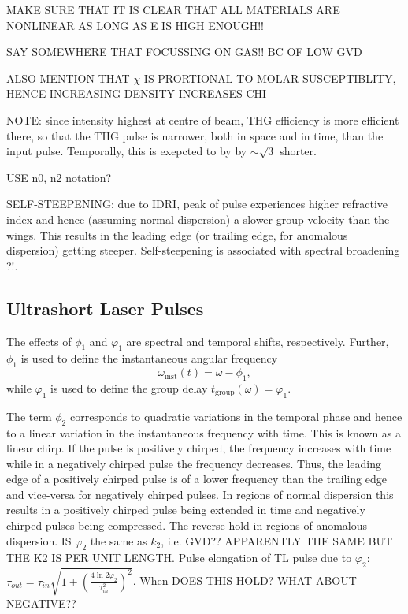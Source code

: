 \documentclass[a4paper]{jpconf}
\begin{document}
MAKE SURE THAT IT IS CLEAR THAT ALL MATERIALS ARE NONLINEAR AS LONG AS E IS HIGH ENOUGH!!

SAY SOMEWHERE THAT FOCUSSING ON GAS!! BC OF LOW GVD 


ALSO MENTION THAT $\chi$ IS PRORTIONAL TO MOLAR SUSCEPTIBLITY, HENCE INCREASING DENSITY INCREASES CHI


NOTE: since intensity highest at centre of beam, THG efficiency is more efficient there, so that the THG pulse is narrower, both in space and in time, than the input pulse. Temporally, this is exepcted to by by $\sim \sqrt{3}$ shorter. 


USE n0, n2 notation?


SELF-STEEPENING: due to IDRI, peak of pulse experiences higher refractive index and hence (assuming normal dispersion) a slower group velocity than the wings. This results in the leading edge (or trailing edge, for anomalous dispersion) getting steeper. Self-steepening is associated with spectral broadening ?!. 

\subsection{Ultrashort Laser Pulses}

The effects of $\phi_1$ and $\varphi_1$ are spectral and temporal shifts, respectively. Further, $\phi_1$ is used to define the instantaneous angular frequency 
\begin{equation}
\omega_\text{inst}(t) = \omega - \phi_1,
\end{equation}  
while $\varphi_1$ is used to define the group delay $t_\text{group}(\omega) = \varphi_1$. \par 
The term $\phi_2$ corresponds to quadratic variations in the temporal phase and hence to a linear variation in the instantaneous frequency with time. This is known as a linear chirp. If the pulse is positively chirped, the frequency increases with time while in a negatively chirped pulse the frequency decreases. Thus, the leading edge of a positively chirped pulse is of a lower frequency than the trailing edge and vice-versa for negatively chirped pulses.  In regions of normal dispersion this results in a positively chirped pulse being extended in time and negatively chirped pulses being compressed. The reverse hold in regions of anomalous dispersion. IS $\varphi_2$ the same as $k_2$, i.e. GVD?? APPARENTLY THE SAME BUT THE K2 IS PER UNIT LENGTH. Pulse elongation of TL pulse due to $\varphi_2$:
$\tau_{out} = \tau_{in} \sqrt{1+ \left( \frac{4 \ln 2 \varphi_2}{\tau_{in}^2} \right)^2}$. When DOES THIS HOLD? WHAT ABOUT NEGATIVE??
\end{document}
